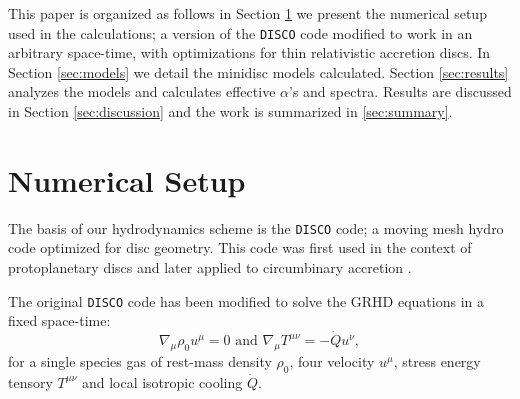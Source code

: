 \documentclass{emulateapj}
\newcommand{\DISCO}{{\texttt{DISCO}}}
\begin{document}
This paper is organized as follows in Section \ref{sec:numerics} we present the
numerical setup used in the calculations; a version of the \DISCO{} code 
modified to work in an arbitrary space-time, with optimizations for thin 
relativistic accretion discs.  In Section \ref{sec:models} we detail the 
minidisc models calculated.  Section \ref{sec:results} analyzes the models and
calculates effective $\alpha$'s and spectra. Results are discussed in Section \ref{sec:discussion} and the work is summarized in \ref{sec:summary}.


\section{Numerical Setup}
\label{sec:numerics}

The basis of our hydrodynamics scheme is the \DISCO{} code; a moving mesh hydro
code optimized for disc geometry. This code was first used in the context of
protoplanetary discs \citep{Duffell12, Duffell13, Duffell14} and later applied 
to circumbinary accretion \citep{Farris14, Farris15A, Farris15B}. 

The original \DISCO{} code has been modified to solve the GRHD equations in a 
fixed space-time:
\begin{equation}
    \nabla_\mu \rho_0 u^\mu = 0 \text{ and } \nabla_\mu T^{\mu\nu} = -\dot{Q} u^\nu , \label{eq:GRHD}
\end{equation}
for a single species gas of rest-mass density $\rho_0$, four velocity $u^\mu$, 
stress energy tensory $T^{\mu\nu}$ and local isotropic cooling $\dot{Q}$.  
\end{document}
